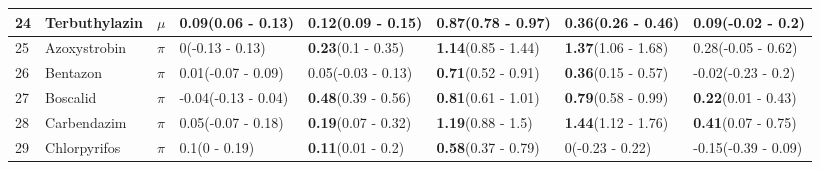 \begin{longtable}{lp{2cm}p{0.7cm}p{2cm}p{2cm}p{2cm}p{2cm}p{2cm}}
  24 & Terbuthylazin & $\mu$ & \textbf{0.09}\newline (0.06 - 0.13) & \textbf{0.12}\newline (0.09 - 0.15) & \textbf{0.87}\newline (0.78 - 0.97) & \textbf{0.36}\newline (0.26 - 0.46) & 0.09\newline (-0.02 - 0.2) \\ 
   \midrule
25 & Azoxystrobin & $\pi$ & 0\newline (-0.13 - 0.13) & \textbf{0.23}\newline (0.1 - 0.35) & \textbf{1.14}\newline (0.85 - 1.44) & \textbf{1.37}\newline (1.06 - 1.68) & 0.28\newline (-0.05 - 0.62) \\ 
  26 & Bentazon & $\pi$ & 0.01\newline (-0.07 - 0.09) & 0.05\newline (-0.03 - 0.13) & \textbf{0.71}\newline (0.52 - 0.91) & \textbf{0.36}\newline (0.15 - 0.57) & -0.02\newline (-0.23 - 0.2) \\ 
  27 & Boscalid & $\pi$ & -0.04\newline (-0.13 - 0.04) & \textbf{0.48}\newline (0.39 - 0.56) & \textbf{0.81}\newline (0.61 - 1.01) & \textbf{0.79}\newline (0.58 - 0.99) & \textbf{0.22}\newline (0.01 - 0.43) \\ 
  28 & Carbendazim & $\pi$ & 0.05\newline (-0.07 - 0.18) & \textbf{0.19}\newline (0.07 - 0.32) & \textbf{1.19}\newline (0.88 - 1.5) & \textbf{1.44}\newline (1.12 - 1.76) & \textbf{0.41}\newline (0.07 - 0.75) \\ 
  29 & Chlorpyrifos & $\pi$ & 0.1\newline (0 - 0.19) & \textbf{0.11}\newline (0.01 - 0.2) & \textbf{0.58}\newline (0.37 - 0.79) & 0\newline (-0.23 - 0.22) & -0.15\newline (-0.39 - 0.09) \\ 

\end{longtable}
